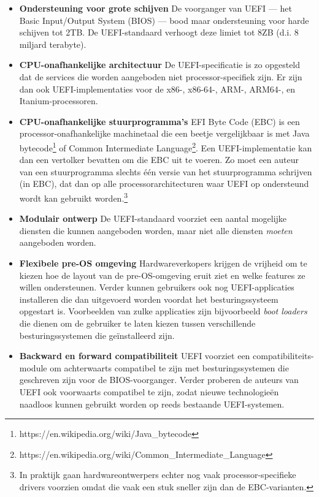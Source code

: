 \begin{itemize}
\item \textbf{Ondersteuning voor grote schijven} De voorganger van UEFI ---{} het Basic Input/Output System (BIOS) ---{} bood maar ondersteuning voor harde schijven tot 2TB. De UEFI-standaard verhoogt deze limiet tot 8ZB (d.i. 8 miljard terabyte).
\item \textbf{CPU-onafhankelijke architectuur} De UEFI-specificatie is zo opgesteld dat de services die worden aangeboden niet processor-specifiek zijn. Er zijn dan ook UEFI-implementaties voor de x86-, x86-64-, ARM-, ARM64-, en Itanium-processoren.
\item \textbf{CPU-onafhankelijke stuurprogramma's} EFI Byte Code (EBC) is een processor-onafhankelijke machinetaal die een beetje vergelijkbaar is met Java bytecode\footnote{https://en.wikipedia.org/wiki/Java\_bytecode} of Common Intermediate Language\footnote{https://en.wikipedia.org/wiki/Common\_Intermediate\_Language}. Een UEFI-implementatie kan dan een vertolker bevatten om die EBC uit te voeren. Zo moet een auteur van een stuurprogramma slechts \'e\'en versie van het stuurprogramma schrijven (in EBC), dat dan op alle processorarchitecturen waar UEFI op ondersteund wordt kan gebruikt worden.\footnote{In praktijk gaan hardwareontwerpers echter nog vaak processor-specifieke drivers voorzien omdat die vaak een stuk sneller zijn dan de EBC-varianten.}
\item \textbf{Modulair ontwerp} De UEFI-standaard voorziet een aantal mogelijke diensten die kunnen aangeboden worden, maar niet alle diensten \emph{moeten} aangeboden worden.
\item \textbf{Flexibele pre-OS omgeving} Hardwareverkopers krijgen de vrijheid om te kiezen hoe de layout van de pre-OS-omgeving eruit ziet en welke features ze willen ondersteunen. Verder kunnen gebruikers ook nog UEFI-applicaties installeren die dan uitgevoerd worden voordat het besturingssysteem opgestart is. Voorbeelden van zulke applicaties zijn bijvoorbeeld \emph{boot loaders} die dienen om de gebruiker te laten kiezen tussen verschillende besturingssystemen die ge\"installeerd zijn.
\item \textbf{Backward en forward compatibiliteit} UEFI voorziet een compatibiliteits-module om achterwaarts compatibel te zijn met besturingssystemen die geschreven zijn voor de BIOS-voorganger. Verder proberen de auteurs van UEFI ook voorwaarts compatibel te zijn, zodat nieuwe technologie\"en naadloos kunnen gebruikt worden op reeds bestaande UEFI-systemen.
\end{itemize}

